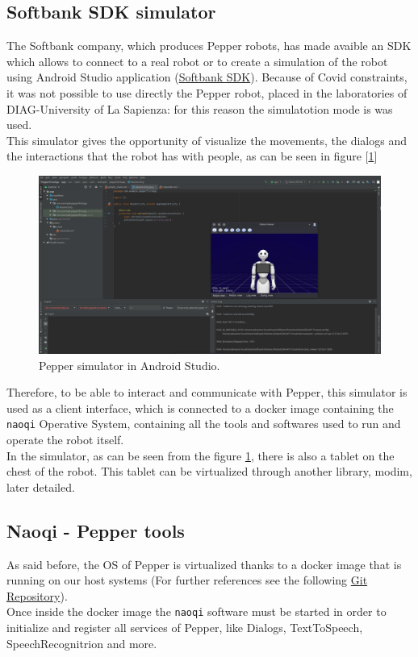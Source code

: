 \documentclass[12pt, letterpaper, twoside]{article}
\begin{document}
\subsection{Softbank SDK simulator}
The Softbank company, which produces Pepper robots, has made avaible an SDK which allows to connect to a real robot or to create a simulation of the robot using Android Studio application (\href{https://qisdk.softbankrobotics.com/sdk/doc/pepper-sdk/index.html}{Softbank SDK}). Because of Covid constraints, it was not possible to use directly the Pepper robot, placed in the laboratories of DIAG-University of La Sapienza: for this reason the simulatotion mode is was used.\\

This simulator gives the opportunity of visualize the movements, the dialogs and the interactions that the robot has with people, as can be seen in figure [\ref{fig:android_sdk}]

\begin{figure}[htbp]
	\centerline{\includegraphics[scale=.3]{img/pepperSDK.png}}
	\caption{Pepper simulator in Android Studio.}
	\label{fig:android_sdk}
\end{figure}

Therefore, to be able to interact and communicate with Pepper, this simulator is used as a client interface, which is connected to a docker image containing the \verb|naoqi| Operative System, containing all the tools and softwares used to run and operate the robot itself.\\
In the simulator, as can be seen from the figure \ref{fig:android_sdk}, there is also a tablet on the chest of the robot. This tablet can be virtualized through another library, modim, later detailed.

\newpage
\subsection{Naoqi - Pepper tools}
As said before, the OS of Pepper is virtualized thanks to a docker image that is running on our host systems (For further references see the following \href{https://bitbucket.org/iocchi/hri_software/src/master/}{Git Repository}).\\
Once inside the docker image the \verb|naoqi| software must be started in order to initialize and register all services of Pepper, like Dialogs, TextToSpeech, SpeechRecognitrion and more.\\
\end{document}
